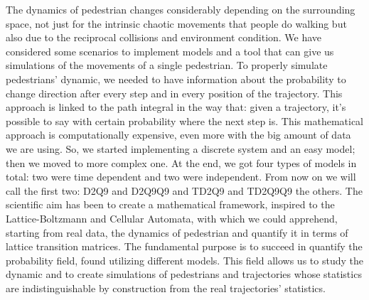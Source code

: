 \documentclass{standalone}
\begin{document}
The dynamics of pedestrian changes considerably depending on the surrounding space, not just for the intrinsic chaotic movements that people do walking but also due to the reciprocal collisions and environment condition. We have considered some scenarios to implement models and a tool that can give us simulations of the movements of a single pedestrian. To properly simulate pedestrians’ dynamic, we needed to have information about the probability to change direction after every step and in every position of the trajectory. This approach is linked to the path integral in the way that: given a trajectory, it’s possible to say with certain probability where the next step is. This mathematical approach is computationally expensive, even more with the big amount of data we are using. So, we started implementing a discrete system and an easy model; then we moved to more complex one. At the end, we got four types of models in total: two were time dependent and two were independent. From now on we will call the first two: D2Q9 and D2Q9Q9 and TD2Q9 and TD2Q9Q9 the others. The scientific aim has been to create a mathematical framework, inspired to the Lattice-Boltzmann and Cellular Automata, with which we could apprehend, starting from real data, the dynamics of pedestrian and quantify it in terms of lattice transition matrices. The fundamental purpose is to succeed in quantify the probability field, found utilizing different models. This field allows us to study the dynamic and to create simulations of pedestrians and trajectories whose statistics are indistinguishable by construction from the real trajectories’ statistics.
\end{document}
